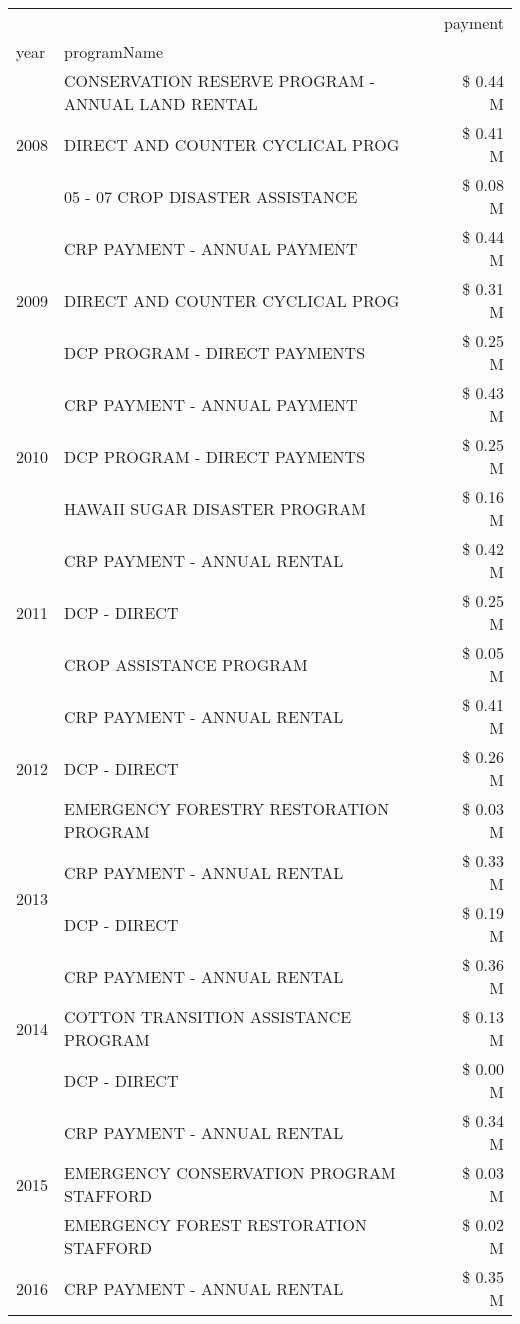 \begin{tabular}{llr}
\toprule
 &  & payment \\
year & programName &  \\
\midrule
\multirow[t]{3}{*}{2008} & CONSERVATION RESERVE PROGRAM - ANNUAL LAND RENTAL & \$ 0.44 M \\
 & DIRECT AND COUNTER CYCLICAL PROG & \$ 0.41 M \\
 & 05 - 07 CROP DISASTER ASSISTANCE & \$ 0.08 M \\
\cline{1-3}
\multirow[t]{3}{*}{2009} & CRP PAYMENT - ANNUAL PAYMENT & \$ 0.44 M \\
 & DIRECT AND COUNTER CYCLICAL PROG & \$ 0.31 M \\
 & DCP PROGRAM - DIRECT PAYMENTS & \$ 0.25 M \\
\cline{1-3}
\multirow[t]{3}{*}{2010} & CRP PAYMENT - ANNUAL PAYMENT & \$ 0.43 M \\
 & DCP PROGRAM - DIRECT PAYMENTS & \$ 0.25 M \\
 & HAWAII SUGAR DISASTER PROGRAM & \$ 0.16 M \\
\cline{1-3}
\multirow[t]{3}{*}{2011} & CRP PAYMENT - ANNUAL RENTAL & \$ 0.42 M \\
 & DCP - DIRECT & \$ 0.25 M \\
 & CROP ASSISTANCE PROGRAM & \$ 0.05 M \\
\cline{1-3}
\multirow[t]{3}{*}{2012} & CRP PAYMENT - ANNUAL RENTAL & \$ 0.41 M \\
 & DCP - DIRECT & \$ 0.26 M \\
 & EMERGENCY FORESTRY RESTORATION PROGRAM & \$ 0.03 M \\
\cline{1-3}
\multirow[t]{2}{*}{2013} & CRP PAYMENT - ANNUAL RENTAL & \$ 0.33 M \\
 & DCP - DIRECT & \$ 0.19 M \\
\cline{1-3}
\multirow[t]{3}{*}{2014} & CRP PAYMENT - ANNUAL RENTAL & \$ 0.36 M \\
 & COTTON TRANSITION ASSISTANCE PROGRAM & \$ 0.13 M \\
 & DCP - DIRECT & \$ 0.00 M \\
\cline{1-3}
\multirow[t]{3}{*}{2015} & CRP PAYMENT - ANNUAL RENTAL & \$ 0.34 M \\
 & EMERGENCY CONSERVATION PROGRAM STAFFORD & \$ 0.03 M \\
 & EMERGENCY FOREST RESTORATION STAFFORD & \$ 0.02 M \\
\cline{1-3}
\multirow[t]{3}{*}{2016} & CRP PAYMENT - ANNUAL RENTAL & \$ 0.35 M \\

\end{tabular}
